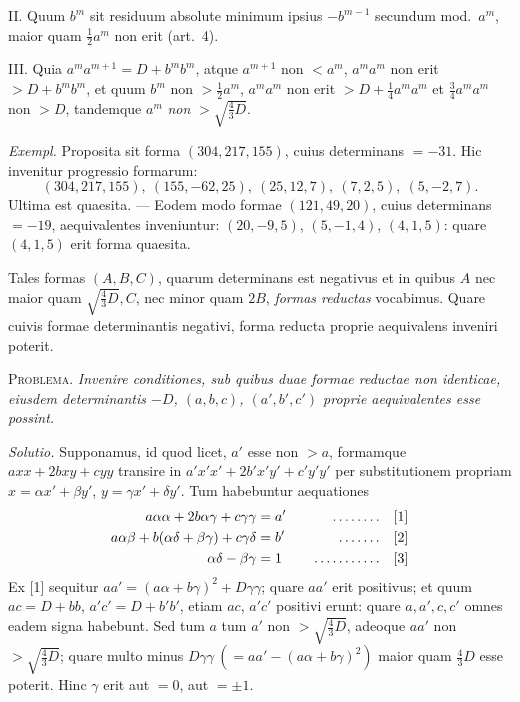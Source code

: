 II. Quum $b^m$ sit residuum absolute minimum ipsius $-b^{m-1}$ secundum mod.\ $a^m$, maior quam $\frac12 a^m$ non erit (art.\ 4).

III. Quia $a^m a^{m+1}=D+b^m b^m$, atque $a^{m+1}$ non $<a^m$, $a^m a^m$ non erit $>D+b^m b^m$, et quum $b^m$ non $>\frac12 a^m$, $a^m a^m$ non erit $>D+\frac14 a^m a^m$ et $\frac34 a^m a^m$ non $>D$, tandemque $a^m$ \emph{non} $>\surd{\frac43 D}$.

\emph{Exempl.} Proposita sit forma $(304,217,155)$, cuius determinans $=-31$. Hic invenitur progressio formarum:
\[
(304,217,155),\ (155,-62,25),\ (25,12,7),\ (7,2,5),\ (5,-2,7).
\]
Ultima est quaesita. --- Eodem modo formae $(121,49,20)$, cuius determinans $=-19$, aequivalentes inveniuntur: $(20,-9,5)$, $(5,-1,4)$, $(4,1,5)$: quare $(4,1,5)$ erit forma quaesita.

Tales formas $(A,B,C)$, quarum determinans est negativus et in quibus $A$ nec maior quam $\surd{\frac43 D},C$, nec minor quam $2B$, \emph{formas reductas} vocabimus. Quare cuivis formae determinantis negativi, forma reducta proprie aequivalens inveniri poterit.

\textsc{Problema.} \emph{Invenire conditiones, sub quibus duae formae reductae non identicae, eiusdem determinantis $-D$, $(a,b,c)$, $(a',b',c')$ proprie aequivalentes esse possint.}

\emph{Solutio.} Supponamus, id quod licet, $a'$ esse non $>a$, formamque $axx+2bxy+cyy$ transire in $a'x'x'+2b'x'y'+c'y'y'$ per substitutionem propriam $x=\alpha x'+\beta y'$, $y=\gamma x'+\delta y'$. Tum habebuntur aequationes
\[
\begin{aligned}
a\alpha\alpha+2b\alpha\gamma+c\gamma\gamma&=a'&\quad\mathinner{.\,.\,.\,.\,.\,.\,.\,.}\quad&[1]\\
a\alpha\beta+b(\alpha\delta+\beta\gamma)+c\gamma\delta&=b'&\quad\mathinner{.\,.\,.\,.\,.\,.\,.}\quad&[2]\\
\alpha\delta-\beta\gamma&=1&\quad\mathinner{.\,.\,.\,.\,.\,.\,.\,.\,.\,.\,.}\quad&[3]
\end{aligned}
\]
Ex [1] sequitur $aa'=(a\alpha+b\gamma)^2+D\gamma\gamma$; quare $aa'$ erit positivus; et quum $ac=D+bb$, $a'c'=D+b'b'$, etiam $ac$, $a'c'$ positivi erunt: quare $a,a',c,c'$ omnes eadem signa habebunt. Sed tum $a$ tum $a'$ non $>\surd{\frac43 D}$, adeoque $aa'$ non $>\surd{\frac43 D}$; quare multo minus $D\gamma\gamma\ (=aa'-(a\alpha+b\gamma)^2)$ maior quam $\frac43 D$ esse poterit. Hinc $\gamma$ erit aut $=0$, aut $=\pm1$.

